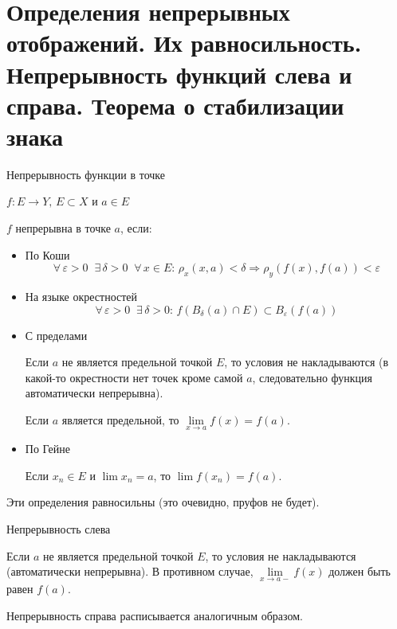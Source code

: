 \section{Определения непрерывных отображений. Их равносильность. Непрерывность функций слева и справа. Теорема о стабилизации знака}

\begin{conj}
    Непрерывность функции в точке
\end{conj}
$f : E \to Y, \, E \subset X$ и $a \in E$

$f$ непрерывна в точке $a$, если:
\begin{itemize}
    \item По Коши
    \[ \forall \, \varepsilon > 0 \;\; \exists \, \delta > 0 \;\; \forall \, x \in E : \, \rho_x(x, a) < \delta \Rightarrow \rho_y(f(x), f(a)) < \varepsilon \]
    \item На языке окрестностей
    \[ \forall \, \varepsilon > 0 \;\; \exists \, \delta > 0 : \, f(B_{\delta}(a) \cap E) \subset B_{\varepsilon}(f(a)) \]
    \item С пределами
    
    Если $a$ не является предельной точкой $E$, то условия не накладываются (в какой-то окрестности нет точек кроме самой $a$, следовательно функция автоматически непрерывна).

    Если $a$ является предельной, то $\lim\limits_{x \to a} f(x) = f(a)$.
    \item По Гейне
    
    Если $x_n \in E$ и $\lim x_n = a$, то $\lim f(x_n) = f(a)$.
\end{itemize}
\begin{notice}
    Эти определения равносильны (это очевидно, пруфов не будет).
\end{notice}

\begin{conj}
    Непрерывность слева

    Если $a$ не является предельной точкой $E$, то условия не накладываются (автоматически непрерывна). 
    В противном случае, $\lim\limits_{x \to a-} f(x)$ должен быть равен $f(a)$. 
\end{conj}
\begin{notice}
    Непрерывность справа расписывается аналогичным образом.
\end{notice}


